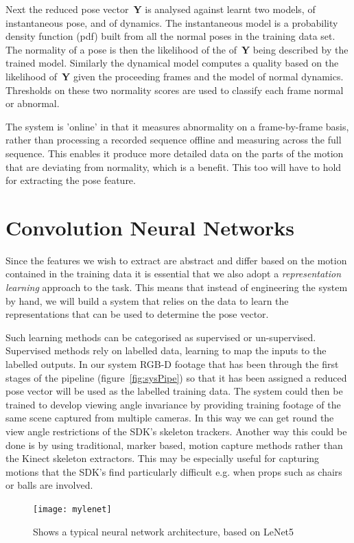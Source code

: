 \documentclass[11pt]{article} %
\begin{document}
Next the reduced pose vector~\textbf{Y} is analysed against learnt two models, of instantaneous pose, and of dynamics. The instantaneous model is a probability density function (pdf) built from all the normal poses in the training data set. The normality of a pose is then the likelihood of the of~\textbf{Y} being described by the trained model. Similarly the dynamical model computes a quality based on the likelihood of~\textbf{Y} given the proceeding frames and the model of normal dynamics. Thresholds on these two normality scores are used to classify each frame normal or abnormal.

The system is 'online' in that it measures abnormality on a frame-by-frame basis, rather than processing a recorded sequence offline and measuring across the full sequence. This enables it produce more detailed data on the parts of the motion that are deviating from normality, which is a benefit. This too will have to hold for extracting the pose feature. 


\section{Convolution Neural Networks}
\label{sec:cnns}

Since the features we wish to extract are abstract and differ based on the motion contained in the training data it is essential that we also adopt a \textit{representation learning} approach to the task. This means that instead of engineering the system by hand, we will build a system that relies on the data to learn the representations that can be used to determine the pose vector. %

Such learning methods can be categorised as supervised or un-supervised. Supervised methods rely on labelled data, learning to map the inputs to the labelled outputs. In our system RGB-D footage that has been through the first stages of the pipeline (figure~\ref{fig:sysPipe}) so that it has been assigned a reduced pose vector will be used as the labelled training data. The system could then be trained to develop viewing angle invariance by providing training footage of the same scene captured from multiple cameras. In this way we can get round the view angle restrictions of the SDK's skeleton trackers. Another way this could be done is by using traditional, marker based, motion capture methods rather than the Kinect skeleton extractors. This may be especially useful for capturing motions that the SDK's find particularly difficult e.g. when props such as chairs or balls are involved.
\begin{figure}
\texttt{[image: mylenet]}
\caption{Shows a typical neural network architecture, based on LeNet5~\cite{LeCun1998} \label{fig:mylenet}  } 
\end{figure}
\end{document}
